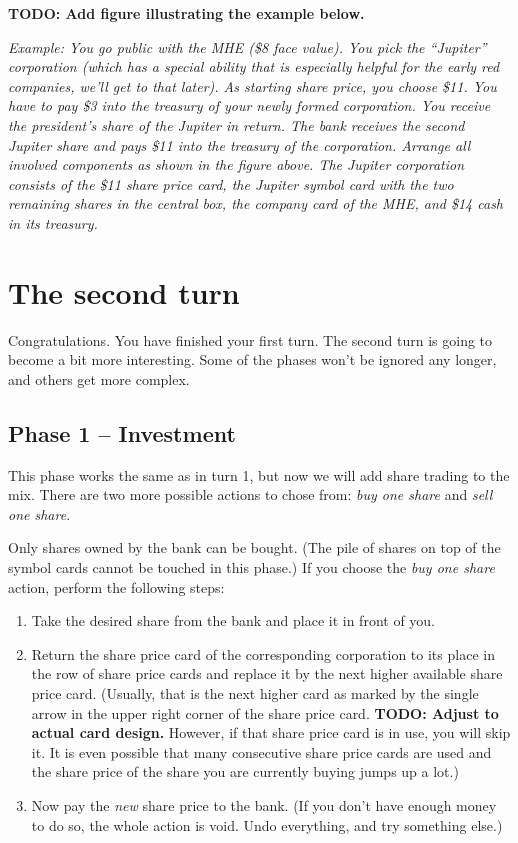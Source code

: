 \documentclass[10pt,final]{report}
\begin{document}
\begin{multicols}{2}
\textbf{TODO: Add figure illustrating the example below.}

\emph{Example: You go public with the MHE (\$8 face value). You pick
  the ``Jupiter'' corporation (which has a special ability that is
  especially helpful for the early red companies, we'll get to that
  later).  As starting share price, you choose \$11. You have to pay
  \$3 into the treasury of your newly formed corporation. You receive
  the president's share of the Jupiter in return. The bank receives the
  second Jupiter share and pays \$11 into the treasury of the
  corporation. Arrange all involved components as shown in the figure
  above. The Jupiter corporation consists of the \$11 share price card,
  the Jupiter symbol card with the two remaining shares in the central
  box, the company card of the MHE, and \$14 cash in its treasury.}

\section{The second turn}

Congratulations. You have finished your first turn. The second turn is
going to become a bit more interesting. Some of the phases won't be
ignored any longer, and others get more complex.

\subsection{Phase 1 -- Investment}

This phase works the same as in turn 1, but now we will add share
trading to the mix. There are two more possible actions to chose from:
\emph{buy one share} and \emph{sell one share}.

Only shares owned by the bank can be bought. (The pile of shares on
top of the symbol cards cannot be touched in this phase.) If you choose
the \emph{buy one share} action, perform the following steps:
\begin{enumerate}
\item Take the desired share from the bank and place it in front of you.
\item Return the share price card of the corresponding corporation to
  its place in the row of share price cards and replace it by the next
  higher available share price card. (Usually, that is the next higher
  card as marked by the single arrow in the upper right corner of the
  share price card. \textbf{TODO: Adjust to actual card design.}
  However, if that share price card is in use, you will skip it. It is
  even possible that many consecutive share price cards are used and
  the share price of the share you are currently buying jumps up a
  lot.)
\item Now pay the \emph{new} share price to the bank. (If you don't
  have enough money to do so, the whole action is void. Undo
  everything, and try something else.)
\end{enumerate}


\end{multicols}
\end{document}
